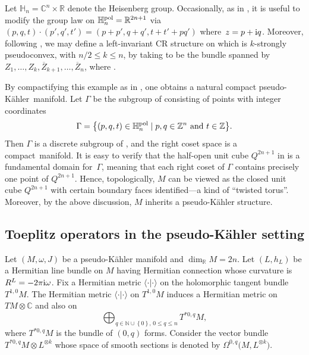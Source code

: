\documentclass[pdftex]{sigma}
\numberwithin{equation}{section}
\newcommand{\set}[1]{\left\{#1\right\}}
\begin{document}
	 \begin{Example}
	 	Let $\mathbb{H}_n = \mathbb{C}^n \times \mathbb{R}$ denote the Heisenberg group. Occasionally, as in \cite{f}, it is useful to modify the group law on $\mathbb{H}_n^{{\rm pol}} = \mathbb{R}^{2n+1}$ via
	 	$(p, q, t)\cdot (p', q', t')=(p+p', q+q', t+t'+pq')$
	 	where~${z=p+{\rm i} q}$. Moreover, following \cite[pp.~436--437]{fs}, we may define a left-invariant CR structure on  which is $k$-strongly pseudoconvex, with $n/2 \leq k \leq n$, by taking  to be the bundle spanned by
	 	$Z_1, \dots, Z_k, \overline{Z}_{k+1}, \dots, \overline{Z}_n $,
	 	where
	 	.
	 	
	 	By compactifying this example as in \cite[p. 68]{f}, one obtains a natural compact pseudo-K\"ahler~manifold. Let $\Gamma$ be the subgroup of  consisting of points with integer coordinates
	 	\[\Gamma =\big\{(p, q, t)\in \mathbb{H}^{\rm pol}_n \mid p, q\in \mathbb{Z}^n\text{ and }t\in \mathbb{Z} \big\} . \]
	 	Then $\Gamma$ is a discrete subgroup of , and the right coset space  is a compact~mani\-fold. It is easy to verify that the half-open unit cube $Q^{2n+1}$ in  is a fundamental domain for~$\Gamma$, meaning that each right coset of $\Gamma$ contains precisely one point of $Q^{2n+1}$. Hence, topologically, $M$ can be viewed as the closed unit cube $Q^{2n+1}$ with certain boundary faces identified—a kind of ``twisted torus''. Moreover, by the above discussion, $M$ inherits a pseudo-K\"ahler structure. \end{Example}
	
	 \subsection{Toeplitz operators in the pseudo-K\"ahler setting}
	
Let $(M, \omega, J)$ be a {pseudo-K\"ahler manifold} and $\dim_{\mathbb{R}}M=2n$. Let $(L, h_L)$ be a Hermitian line bundle on $M$ having Hermitian connection whose curvature is $R^L=-2\pi {\rm i} \omega$. Fix a Hermitian metric $\langle \cdot | \cdot \rangle$ on the holomorphic tangent bundle $T^{1,0}M$. The Hermitian metric $\langle \cdot | \cdot \rangle$ on $T^{1,0}M$ induces a Hermitian metric on $TM\otimes\mathbb C$ and also on
 \[
 \bigoplus_{q\in\mathbb N\cup\set{0},\,0\leq q\leq n}T^{*0,q}M,
\]
 where $T^{*0,q}M$ is the bundle of $(0,q)$ forms. Consider the vector bundle $T^{*0,q}M\otimes L^{\otimes k}$ whose space of smooth sections is denoted by $\Omega^{0,q}\bigl(M,L^{\otimes k}\bigr)$.
	 	
\end{document}
